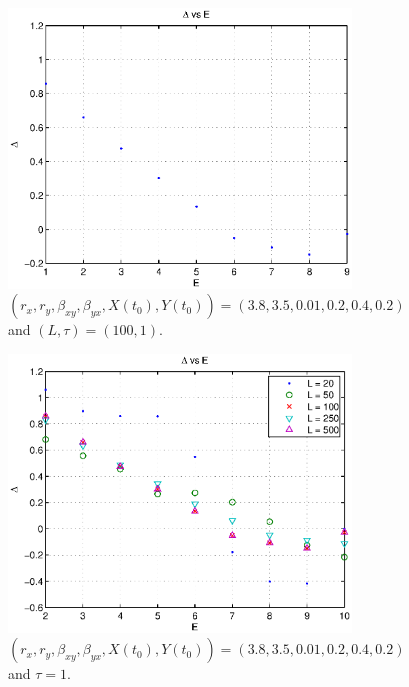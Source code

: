 \documentclass[a4paper,11pt]{article}
\begin{document}
\begin{figure}[h!t]
\centering
\begin{subfigure}[b]{0.4\textwidth}
\label{fig:SugDeltavE}
\includegraphics[scale=0.55]{graphics/SugDeltavE.eps}
\caption{$\left(r_x,r_y,\beta_{xy},\beta_{yx},X(t_0),Y(t_0)\right) = \left(3.8,3.5,0.01,0.2,0.4,0.2\right)$ and $\left(L,\tau\right) = \left(100,1\right)$.}
\end{subfigure}
\begin{subfigure}[b]{0.4\textwidth}
\label{fig:SugDeltavEandL}
\includegraphics[scale=0.55]{graphics/SugDeltavEandL.eps}
\caption{$\left(r_x,r_y,\beta_{xy},\beta_{yx},X(t_0),Y(t_0)\right) = \left(3.8,3.5,0.01,0.2,0.4,0.2\right)$ and $ \tau = 1$.}
\end{subfigure}
\caption{}
\end{figure}
\end{document}
